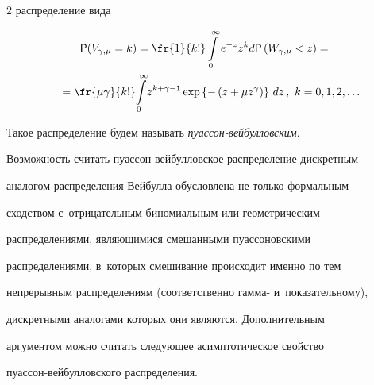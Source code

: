 \begin{multicols}{2}
распределение вида





\vspace*{-2pt}





\noindent


\begin{multline*}


{\sf P}(V_{\gamma,\mu}=k)=\fr{1}{k!}\int\limits_{0}^{\infty}e^{-z}z^kd{\sf P}


\left(W_{\gamma,\mu}<z\right)={}\\


{}=


\fr{\mu\gamma}{k!}\!\int\limits_{0}^{\infty}\!z^{k+\gamma-1}\exp\left\{-\left(z+\mu 


z^{\gamma}\right)\right\}\,dz\,,\ k=0,1,2,\ldots\hspace*{-6.64555pt}


\end{multline*}





\vspace*{-2pt}





\noindent


Такое распределение будем называть \textit{пуас\-сон-вей\-бул\-лов\-ским}.


Возможность считать пуас\-сон-вей\-буллов\-ское распределение дискретным


аналогом распределения Вейбулла обусловлена не только формальным


сходством с~отрицательным биномиальным или геометрическим


распределениями, являющимися смешанными пуассоновскими


распределениями, в~которых смешивание происходит именно по тем


непрерывным распределениям (соответственно гамма- и~показательному),


дискретными аналогами которых они являются. Дополнительным


аргументом можно считать следующее асимптотическое свойство


пуас\-сон-вей\-бул\-лов\-ско\-го распределения.





\smallskip






\end{multicols}
